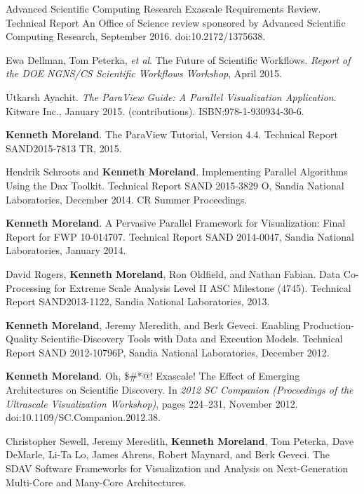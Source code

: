 \begin{enumerate}[label={[\arabic*]}, left=0pt]
  Advanced Scientific Computing Research Exascale Requirements Review.
Technical Report An Office of Science review sponsored by Advanced Scientific Computing Research, September 2016.
  doi:10.2172/1375638.
\item  %
  Ewa Dellman, Tom Peterka, \emph{et al}.
  The Future of Scientific Workflows.
\emph{Report of the DOE NGNS/CS Scientific Workflows Workshop}, April 2015.
\item  %
  Utkarsh Ayachit.
  \emph{The {ParaView} Guide: A Parallel Visualization Application}.
Kitware Inc., January 2015.
(contributions).  ISBN:978-1-930934-30-6.
\item  %
  \textbf{Kenneth Moreland}.
  The {ParaView} Tutorial, Version 4.4.
Technical Report SAND2015-7813 TR, 2015.
\item  %
  Hendrik Schroots and \textbf{Kenneth Moreland}.
  Implementing Parallel Algorithms Using the Dax Toolkit.
Technical Report SAND 2015-3829 O, Sandia National Laboratories, December 2014.
CR Summer Proceedings.\item  %
  \textbf{Kenneth Moreland}.
  A Pervasive Parallel Framework for Visualization: Final Report for FWP 10-014707.
Technical Report SAND 2014-0047, Sandia National Laboratories, January 2014.
\item  %
  David Rogers, \textbf{Kenneth Moreland}, Ron Oldfield, and Nathan Fabian.
  Data Co-Processing for Extreme Scale Analysis Level {II} {ASC} Milestone (4745).
Technical Report SAND2013-1122, Sandia National Laboratories, 2013.
\item  %
  \textbf{Kenneth Moreland}, Jeremy Meredith, and Berk Geveci.
  Enabling Production-Quality Scientific-Discovery Tools with Data and Execution Models.
Technical Report SAND 2012-10796P, Sandia National Laboratories, December 2012.
\item  %
  \textbf{Kenneth Moreland}.
  {Oh, \$\#*@! Exascale!} {The} Effect of Emerging Architectures on Scientific Discovery.
  In \emph{2012 SC Companion (Proceedings of the Ultrascale Visualization Workshop)}, pages 224--231, November 2012.
  doi:10.1109/SC.Companion.2012.38.
\item  %
  Christopher Sewell, Jeremy Meredith, \textbf{Kenneth Moreland}, Tom Peterka, Dave DeMarle, Li-Ta Lo, James Ahrens, Robert Maynard, and Berk Geveci.
  The {SDAV} Software Frameworks for Visualization and Analysis on Next-Generation Multi-Core and Many-Core Architectures.

\end{enumerate}
